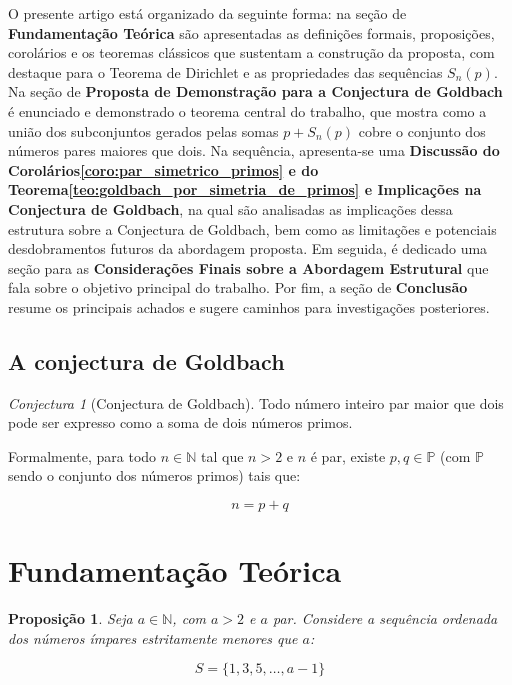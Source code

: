 \documentclass[a4paper,11pt]{article}
\newtheorem{proposition}[theorem]{Proposição}
\theoremstyle{definition}
\theoremstyle{remark}
\newtheorem{conjecture}{Conjectura}
\begin{document}
\begin{otherlanguage}{brazil}
	O presente artigo está organizado da seguinte forma: na seção de \textbf{Fundamentação Teórica} são apresentadas as definições formais, proposições, corolários e os teoremas clássicos que sustentam a construção da proposta, com destaque para o Teorema de Dirichlet e as propriedades das sequências \(S_n(p)\). Na seção de \textbf{Proposta de Demonstração para a Conjectura de Goldbach} é enunciado e demonstrado o teorema central do trabalho, que mostra como a união dos subconjuntos gerados pelas somas \(p + S_n(p)\) cobre o conjunto dos números pares maiores que dois. Na sequência, apresenta-se uma \textbf{Discussão do Corolários\ref{coro:par_simetrico_primos} e do Teorema\ref{teo:goldbach_por_simetria_de_primos} e Implicações na Conjectura de Goldbach}, na qual são analisadas as implicações dessa estrutura sobre a Conjectura de Goldbach, bem como as limitações e potenciais desdobramentos futuros da abordagem proposta. Em seguida, é dedicado uma seção para as \textbf{Considerações Finais sobre a Abordagem Estrutural} que fala sobre o objetivo principal do trabalho. Por fim, a seção de \textbf{Conclusão} resume os principais achados e sugere caminhos para investigações posteriores.

	
	\subsection*{A conjectura de Goldbach}
	\begin{conjecture}[Conjectura de Goldbach]
		Todo número inteiro par maior que dois pode ser expresso como a soma de dois números primos.
		
		Formalmente, para todo \(n \in \mathbb{N}\) tal que \(n > 2\) e \(n\) é par, existe \(p, q \in \mathbb{P}\) (com \(\mathbb{P}\) sendo o conjunto dos números primos) tais que:
		
		\[
		n = p + q
		\]
		
	\end{conjecture}
	
	
	\section{Fundamentação Teórica}
	
	\begin{proposition}
		Seja $a \in \mathbb{N}$, com $a > 2$ e $a$ par. Considere a sequência ordenada dos números ímpares estritamente menores que $a$:
		
		\[
		S = \{1, 3, 5, \dotsc, a - 1\}
		\]
		

\end{proposition}
\end{otherlanguage}
\end{document}
